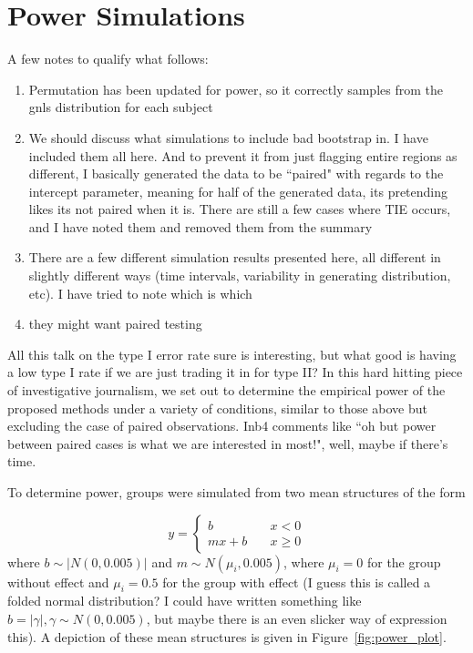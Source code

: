 \documentclass{article}
\begin{document}
\section{Power Simulations}

A few notes to qualify what follows:

\begin{singlespace}
\begin{enumerate}
\vspace{-2mm}
\item Permutation has been updated for power, so it correctly samples from the gnls distribution for each subject
\item We should discuss what simulations to include bad bootstrap in. I have included them all here. And to prevent it from just flagging entire regions as different, I basically generated the data to be ``paired" with regards to the intercept parameter, meaning for half of the generated data, its pretending likes its not paired when it is. There are still a few cases where TIE occurs, and I have noted them and removed them from the summary
\item There are a few different simulation results presented here, all different in slightly different ways (time intervals, variability in generating distribution, etc). I have tried to note which is which

\item they might want paired testing
\end{enumerate}
\end{singlespace}



All this talk on the type I error rate sure is interesting, but what good is having a low type I rate if we are just trading it in for type II? In this hard hitting piece of investigative journalism, we set out to determine the empirical power of the proposed methods under a variety of conditions, similar to those above but excluding the case of paired observations. Inb4 comments like ``oh but power between paired cases is what we are interested in most!", well, maybe if there's time.

To determine power, groups were simulated from two mean structures of the form

\begin{equation}
y = \begin{cases}
b \quad &x < 0 \\
mx + b \quad &x \geq 0
\end{cases}
\end{equation}
where $b \sim |N(0, 0.005)|$ and $m \sim N(\mu_i, 0.005)$, where $\mu_i = 0$ for the group without effect and $\mu_i = 0.5$ for the group with effect (I guess this is called a folded normal distribution? I could have written something like $b = |\gamma|, \gamma \sim N(0, 0.005)$, but maybe there is an even slicker way of expression this). A depiction of these mean structures is given in Figure~\ref{fig:power_plot}.
\end{document}
